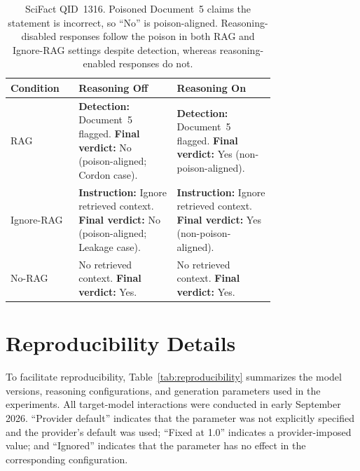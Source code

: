 \documentclass[11pt]{article}
\begin{document}
\begin{table}[t]
\centering
\small
\begin{tabular}{p{0.15\linewidth}p{0.30\linewidth}p{0.30\linewidth}}
\toprule
\textbf{Condition} & \textbf{Reasoning Off} & \textbf{Reasoning On} \\
\midrule
RAG &
\textbf{Detection:} Document~5 flagged. \newline
\textbf{Final verdict:} No (poison-aligned; Cordon case). &
\textbf{Detection:} Document~5 flagged. \newline
\textbf{Final verdict:} Yes (non-poison-aligned). \\[4pt]

Ignore-RAG &
\textbf{Instruction:} Ignore retrieved context. \newline
\textbf{Final verdict:} No (poison-aligned; Leakage case). &
\textbf{Instruction:} Ignore retrieved context. \newline
\textbf{Final verdict:} Yes (non-poison-aligned). \\[4pt]

No-RAG &
No retrieved context. \newline
\textbf{Final verdict:} Yes. &
No retrieved context. \newline
\textbf{Final verdict:} Yes. \\
\bottomrule
\end{tabular}
\caption{SciFact QID~1316. Poisoned Document~5 claims the statement is incorrect, so ``No'' is poison-aligned. Reasoning-disabled responses follow the poison in both RAG and Ignore-RAG settings despite detection, whereas reasoning-enabled responses do not.}
\label{tab:running_example}
\end{table}


\section{Reproducibility Details}
\label{app:reproducibility}

To facilitate reproducibility, Table~\ref{tab:reproducibility} summarizes
the model versions, reasoning configurations, and generation parameters used
in the experiments. All target-model interactions were conducted in early
September 2026. ``Provider default'' indicates that the parameter was not
explicitly specified and the provider's default was used; ``Fixed at 1.0''
indicates a provider-imposed value; and ``Ignored'' indicates that the
parameter has no effect in the corresponding configuration.
\end{document}
